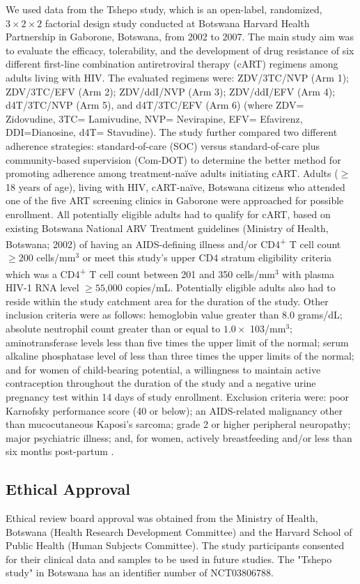 \documentclass[10pt]{NSP1}
\begin{document}
We used data from the Tshepo study, which is an open-label, randomized, $3\times 2 \times 2$ factorial design study conducted at Botswana Harvard Health Partnership in Gaborone, Botswana, from 2002 to 2007. The main study aim was to evaluate the efficacy, tolerability, and the development of drug resistance of six different first-line combination antiretroviral therapy (cART) regimens among adults living with HIV. The evaluated regimens were: ZDV/3TC/NVP (Arm 1); ZDV/3TC/EFV (Arm 2); ZDV/ddI/NVP (Arm 3); ZDV/ddI/EFV (Arm 4); d4T/3TC/NVP (Arm 5), and d4T/3TC/EFV (Arm 6) (where ZDV= Zidovudine, 3TC= Lamivudine, NVP= Nevirapine, EFV= Efavirenz, DDI=Dianosine, d4T= Stavudine). The study further compared two different adherence strategies: standard-of-care (SOC) versus standard-of-care plus community-based supervision (Com-DOT) to determine the better method for promoting adherence among treatment-naïve adults initiating cART. Adults ($\geq$18 years of age), living with HIV, cART-naïve, Botswana citizens who attended one of the five ART screening clinics in Gaborone were approached for possible enrollment. All potentially eligible adults had to qualify for cART, based on existing Botswana National ARV Treatment guidelines (Ministry of Health, Botswana; 2002) of having an AIDS-defining illness and/or CD4\textsuperscript{+} T cell count $\geq 200$ cells/mm$^3$ or meet this study's upper CD4 stratum eligibility criteria which was a CD4\textsuperscript{+} T cell count between 201 and 350 cells/mm$^3$ with plasma HIV-1 RNA level $\geq 55$,000 copies/mL. Potentially eligible adults also had to reside within the study catchment area for the duration of the study. Other inclusion criteria were as follows: hemoglobin value greater than 8.0 grams/dL; absolute neutrophil count greater than or equal to $1.0 \times $ 103/mm$^3$; aminotransferase levels less than five times the upper limit of the normal; serum alkaline phosphatase level of less than three times the upper limits of the normal; and for women of child-bearing potential, a willingness to maintain active contraception throughout the duration of the study and a negative urine pregnancy test within 14 days of study enrollment. Exclusion criteria were: poor Karnofsky performance score (40 or below); an AIDS-related malignancy other than mucocutaneous Kaposi's sarcoma; grade 2 or higher peripheral neuropathy; major psychiatric illness; and, for women, actively breastfeeding and/or less than six months post-partum \cite{Bussmann2009}.

\subsection{Ethical Approval}
Ethical review board approval was obtained from the Ministry of Health, Botswana (Health Research Development Committee) and the Harvard School of Public Health (Human Subjects Committee). The study participants consented for their clinical data and samples to be used in future studies. The "Tshepo study" in Botswana has an identifier number of NCT03806788.
\end{document}
